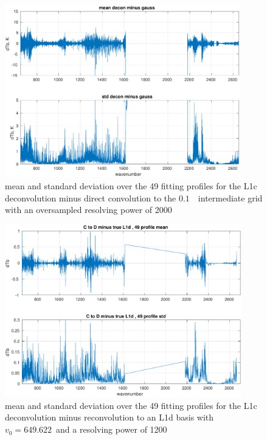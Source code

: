 \documentclass[11pt]{article}
\begin{document}
\begin{figure} %
  \centering
  \includegraphics[height=7.5cm]{figures/airs_decon_diff.pdf}
  \caption{mean and standard deviation over the 49 fitting profiles
    for the L1c deconvolution minus direct convolution to the
    $0.1$~\wn\ intermediate grid with an oversampled resolving
    power of 2000}
  \label{ddiff}
\end{figure}

\begin{figure} %
  \centering
  \includegraphics[height=7.5cm]{figures/CtoD1200_diff.pdf}
  \caption{mean and standard deviation over the 49 fitting profiles
    for the L1c deconvolution minus reconvolution to an L1d basis
    with $v_0=649.622$~\wn and a resolving power of 1200}
  \label{L1d1200}
\end{figure}
\end{document}
